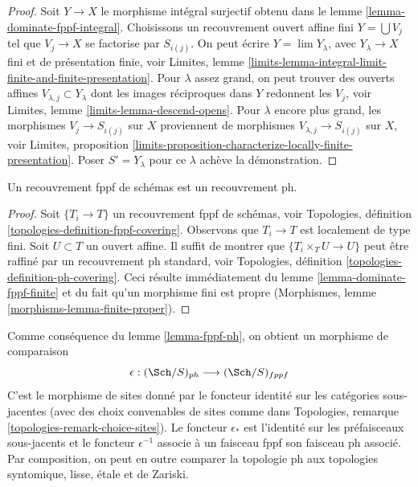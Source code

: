 \begin{proof}
Soit $Y \to X$ le morphisme intégral surjectif obtenu dans le
lemme \ref{lemma-dominate-fppf-integral}.
Choisissons un recouvrement ouvert affine fini $Y = \bigcup V_j$
tel que $V_j \to X$ se factorise par $S_{i(j)}$.
On peut écrire $Y = \lim Y_\lambda$, avec
$Y_\lambda \to X$ fini et de présentation finie, voir
Limites, lemme \ref{limits-lemma-integral-limit-finite-and-finite-presentation}.
Pour $\lambda$ assez grand, on peut trouver des ouverts affines
$V_{\lambda, j} \subset Y_\lambda$
dont les images réciproques dans $Y$ redonnent les $V_j$, voir
Limites, lemme \ref{limits-lemma-descend-opens}.
Pour $\lambda$ encore plus grand, les morphismes $V_j \to S_{i(j)}$
sur $X$ proviennent de morphismes $V_{\lambda, j} \to S_{i(j)}$ sur
$X$, voir
Limites, proposition
\ref{limits-proposition-characterize-locally-finite-presentation}.
Poser $S' = Y_\lambda$ pour ce $\lambda$ achève la démonstration.
\end{proof}

\begin{lemma}
\label{lemma-fppf-ph}
Un recouvrement fppf de schémas est un recouvrement ph.
\end{lemma}

\begin{proof}
Soit $\{T_i \to T\}$ un recouvrement fppf de schémas, voir
Topologies, définition \ref{topologies-definition-fppf-covering}.
Observons que $T_i \to T$ est localement de type fini.
Soit $U \subset T$ un ouvert affine.
Il suffit de montrer que $\{T_i \times_T U \to U\}$
peut être raffiné par un recouvrement ph standard, voir
Topologies, définition \ref{topologies-definition-ph-covering}.
Ceci résulte immédiatement du lemme \ref{lemma-dominate-fppf-finite}
et du fait qu'un morphisme fini est propre
(Morphismes, lemme \ref{morphisms-lemma-finite-proper}).
\end{proof}

\begin{remark}
\label{remark-change-topologies}
Comme conséquence du lemme \ref{lemma-fppf-ph}, on obtient un morphisme de comparaison
$$
\epsilon : (\Sch/S)_{ph} \longrightarrow (\Sch/S)_{fppf}
$$
C'est le morphisme de sites donné par le foncteur identité
sur les catégories sous-jacentes (avec des choix convenables de sites
comme dans Topologies, remarque \ref{topologies-remark-choice-sites}).
Le foncteur $\epsilon_*$ est l'identité sur les préfaisceaux sous-jacents
et le foncteur $\epsilon^{-1}$ associe à un faisceau fppf
son faisceau ph associé.
Par composition, on peut en outre comparer la topologie ph
aux topologies syntomique, lisse, \'etale et de Zariski.
\end{remark}




